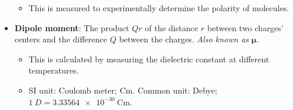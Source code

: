 \documentclass[../notes.tex]{subfiles}
\begin{document}
\begin{itemize}
    \begin{itemize}
        \item This is measured to experimentally determine the polarity of molecules.
    \end{itemize}
    \item \textbf{Dipole moment}: The product $Qr$ of the distance $r$ between two charges' centers and the difference $Q$ between the charges. \emph{Also known as} $\bm{\mu}$.
    \begin{itemize}
        \item This is calculated by measuring the dielectric constant at different temperatures.
        \item SI unit: Coulomb meter; $\si{\coulomb\meter}$. Common unit: Debye; $\SI{1}{D}=\SI{3.33564e-30}{\coulomb\meter}$.
    \end{itemize}
\end{itemize}
\end{document}
